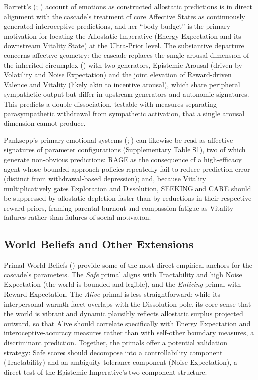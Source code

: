 \documentclass[
  jou,
  floatsintext,
  longtable,
  nolmodern,
  notxfonts,
  notimes,
  12pt,
  colorlinks=true,linkcolor=blue,citecolor=blue,urlcolor=blue]{apa7}
\begin{document}
Barrett's (;
) account of emotions as
constructed allostatic predictions is in direct alignment with the
cascade's treatment of core Affective States as continuously generated
interoceptive predictions, and her ``body budget'' is the primary
motivation for locating the Allostatic Imperative (Energy Expectation
and its downstream Vitality State) at the Ultra-Prior level. The
substantive departure concerns affective geometry: the cascade replaces
the single arousal dimension of the inherited circumplex
() with two
generators, Epistemic Arousal (driven by Volatility and Noise
Expectation) and the joint elevation of Reward-driven Valence and
Vitality (likely akin to incentive arousal), which share peripheral
sympathetic output but differ in upstream generators and autonomic
signatures. This predicts a double dissociation, testable with measures
separating parasympathetic withdrawal from sympathetic activation, that
a single arousal dimension cannot produce.

Panksepp's primary emotional systems
(;
) can
likewise be read as affective signatures of parameter configurations
(Supplementary Table S1), two of which generate non-obvious predictions:
RAGE as the consequence of a high-efficacy agent whose bounded approach
policies repeatedly fail to reduce prediction error (distinct from
withdrawal-based depression); and, because Vitality multiplicatively
gates Exploration and Dissolution, SEEKING and CARE should be suppressed
by allostatic depletion faster than by reductions in their respective
reward priors, framing parental burnout and compassion fatigue as
Vitality failures rather than failures of social motivation.

\subsection{World Beliefs and Other
Extensions}\label{world-beliefs-and-other-extensions}

Primal World Beliefs () provide some of the most direct empirical anchors for the
cascade's parameters. The \emph{Safe} primal aligns with Tractability
and high Noise Expectation (the world is bounded and legible), and the
\emph{Enticing} primal with Reward Expectation. The \emph{Alive} primal
is less straightforward: while its interpersonal warmth facet overlaps
with the Dissolution pole, its core sense that the world is vibrant and
dynamic plausibly reflects allostatic surplus projected outward, so that
Alive should correlate specifically with Energy Expectation and
interoceptive-accuracy measures rather than with self-other boundary
measures, a discriminant prediction. Together, the primals offer a
potential validation strategy: Safe scores should decompose into a
controllability component (Tractability) and an ambiguity-tolerance
component (Noise Expectation), a direct test of the Epistemic
Imperative's two-component structure.
\end{document}
